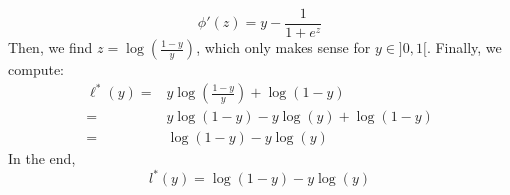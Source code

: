 \documentclass[math, info]{cours}
\begin{document}
\begin{itemize}
\begin{equation*}
			\phi'(z) = y - \frac{1}{1 + e^{z}}
		\end{equation*}
		Then, we find $z = \log\left( \frac{1 - y}{y} \right)$, which only makes sense for $y \in ]0, 1[$.
		Finally, we compute:
		\begin{equation*}
			\begin{aligned}
				\ell^{*}(y) =& y\log\left( \frac{1-y}{y} \right) + \log(1- y)\\
				=& y\log(1 - y) - y\log(y) + \log(1 - y)\\
				=& \log(1 - y) - y\log(y)
			\end{aligned}
		\end{equation*}
		In the end,
		\begin{equation*}
			\boxed{l^{*}(y) = \log\left( 1 - y \right) - y\log\left( y \right)}
		\end{equation*}
\end{itemize}
\end{document}

